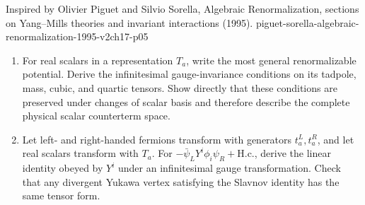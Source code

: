\begin{enumerate}
  {Inspired by Olivier Piguet and Silvio Sorella, Algebraic Renormalization, sections on Yang--Mills theories and invariant interactions (1995).}
  {piguet-sorella-algebraic-renormalization-1995-v2ch17-p05}
  \begin{enumerate}
    \item[(a)]
    For real scalars in a representation \(T_a\), write the most
    general renormalizable potential.  Derive the infinitesimal
    gauge-invariance conditions on its tadpole, mass, cubic, and quartic
    tensors.  Show directly that these conditions are preserved under
    changes of scalar basis and therefore describe the complete physical
    scalar counterterm space.
    \item[(b)]
    Let left- and right-handed fermions transform with generators
    \(t_a^L,t_a^R\), and let real scalars transform with
    \(T_a\).  For
    \(-\bar\psi_LY^i\phi_i\psi_R+\mathrm{H.c.}\), derive the linear identity
    obeyed by \(Y^i\) under an infinitesimal gauge transformation.  Check
    that any divergent Yukawa vertex satisfying the Slavnov identity has
    the same tensor form.
  \end{enumerate}


\end{enumerate}
